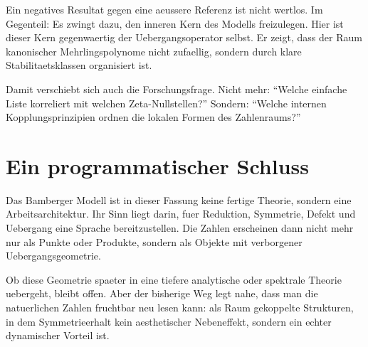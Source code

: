 \documentclass[11pt,a4paper]{article}
\begin{document}
Ein negatives Resultat gegen eine aeussere Referenz ist nicht wertlos. Im Gegenteil: Es zwingt dazu, den inneren Kern des Modells freizulegen. Hier ist dieser Kern gegenwaertig der Uebergangsoperator selbst. Er zeigt, dass der Raum kanonischer Mehrlingspolynome nicht zufaellig, sondern durch klare Stabilitaetsklassen organisiert ist.

Damit verschiebt sich auch die Forschungsfrage. Nicht mehr: \enquote{Welche einfache Liste korreliert mit welchen Zeta-Nullstellen?} Sondern: \enquote{Welche internen Kopplungsprinzipien ordnen die lokalen Formen des Zahlenraums?}

\section{Ein programmatischer Schluss}

Das Bamberger Modell ist in dieser Fassung keine fertige Theorie, sondern eine Arbeitsarchitektur. Ihr Sinn liegt darin, fuer Reduktion, Symmetrie, Defekt und Uebergang eine Sprache bereitzustellen. Die Zahlen erscheinen dann nicht mehr nur als Punkte oder Produkte, sondern als Objekte mit verborgener Uebergangsgeometrie.

Ob diese Geometrie spaeter in eine tiefere analytische oder spektrale Theorie uebergeht, bleibt offen. Aber der bisherige Weg legt nahe, dass man die natuerlichen Zahlen fruchtbar neu lesen kann: als Raum gekoppelte Strukturen, in dem Symmetrieerhalt kein aesthetischer Nebeneffekt, sondern ein echter dynamischer Vorteil ist.
\end{document}
